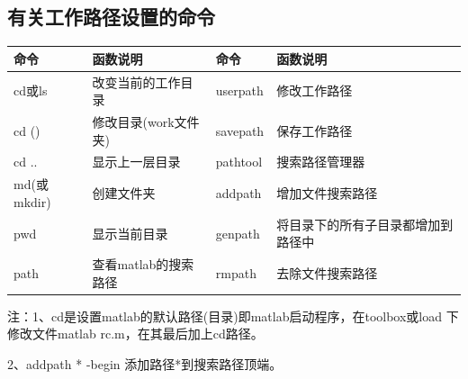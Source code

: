     \subsection{有关工作路径设置的命令}
        \begin{table}[H]
        \centering
          \begin{tabular}{llll}
            \toprule
            命令 & 函数说明&命令 & 函数说明\\
            \midrule
        cd或ls  &改变当前的工作目录&userpath  &修改工作路径\\
        cd () &修改目录(work文件夹)&savepath  &保存工作路径\\
        cd ..  &显示上一层目录&pathtool  &搜索路径管理器\\
        md(或mkdir)  &创建文件夹&addpath &增加文件搜索路径\\
        pwd &显示当前目录&genpath &将目录下的所有子目录都增加到路径中\\
        path  &查看matlab的搜索路径&rmpath  &去除文件搜索路径\\
        \bottomrule
        \end{tabular}
        \end{table}
        \noindent 注：1、cd是设置matlab的默认路径(目录)即matlab启动程序，在toolbox或load 下修改文件matlab rc.m，在其最后加上cd路径。
        \par
         2、addpath * -begin 添加路径*到搜索路径顶端。

